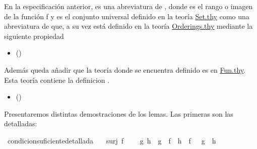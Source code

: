 \begin{isabellebody}
%
\endisatagproof
{\isafoldproof}%
%
\isadelimproof
%
\endisadelimproof
%
\begin{isamarkuptext}%
En la especificación anterior,  es una abreviatura de 
  , donde  es el rango o imagen
de la función f y  es el conjunto universal definido en la 
  teoría \href{http://bit.ly/2XtHCW6}{Set.thy} como una abreviatura de 
   que, a su vez está definido en la teoría 
  \href{http://bit.ly/2Xyj9Pe}{Orderings.thy} mediante la siguiente
  propiedad 
  \begin{itemize}
    \item[]  
      \hfill ()
  \end{itemize} 
Además queda añadir que la teoría donde se encuentra definido
  es en \href{http://bit.ly/2XuPQx5}{Fun.thy}. Esta
 teoría contiene la definicion .
 \begin{itemize}
    \item[] 
 \hfill ()
  \end{itemize}%
\end{isamarkuptext}\isamarkuptrue%
%
\isadelimdocument
%
\endisadelimdocument
%
\isatagdocument
%
\isamarkuptrue%
%
\endisatagdocument
{\isafolddocument}%
%
\isadelimdocument
%
\endisadelimdocument
%
\begin{isamarkuptext}%
Presentaremos distintas demostraciones de los lemas. Las primeras son
 las detalladas:%
\end{isamarkuptext}\isamarkuptrue%
\isamarkupfalse%
\ condicion{\isacharunderscore}suficiente{\isacharunderscore}detallada{\isacharcolon}\isanewline
\ \ \ {\isachardoublequoteopen}surj\ f{\isachardoublequoteclose}\ \isanewline
\ \ \ {\isachardoublequoteopen}{\isasymforall}g\ h{\isachardot}\ {\isacharparenleft}\ g\ {\isasymcirc}\ f\ {\isacharequal}\ h\ {\isasymcirc}\ f\ {\isacharparenright}\ {\isasymlongrightarrow}\ {\isacharparenleft}g\ {\isacharequal}\ h{\isacharparenright}{\isachardoublequoteclose}\isanewline
%
\isadelimproof

\end{isabellebody}
